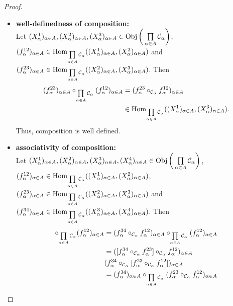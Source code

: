 \documentclass{book}
\begin{document}
	\begin{proof}\
		\begin{itemize}
			\item \textbf{well-definedness of composition: } \\ 
			Let $(X^1_{\alpha})_{\alpha \in A}, (X^2_{\alpha})_{\alpha \in A}, (X^3_{\alpha})_{\alpha \in A} \in \operatorname{Obj} \bigg( \prod\limits_{\alpha \in A} \mathcal{C}_{\alpha} \bigg)$, $(f^{12}_{\alpha})_{\alpha \in A} \in \operatorname{Hom}_{\prod\limits_{\alpha \in A} \mathcal{C}_{\alpha}}((X^1_{\alpha})_{\alpha \in A}, (X^2_{\alpha})_{\alpha \in A})$ and $(f^{23}_{\alpha})_{\alpha \in A} \in \operatorname{Hom}_{\prod\limits_{\alpha \in A} \mathcal{C}_{\alpha}}((X^2_{\alpha})_{\alpha \in A}, (X^3_{\alpha})_{\alpha \in A})$. Then 
			\begin{align*}
				(f^{23}_{\alpha})_{\alpha \in A} \circ_{\prod\limits_{\alpha \in A} \mathcal{C}_{\alpha}} (f^{12}_{\alpha})_{\alpha \in A}
				& = (f^{23}_{\alpha} \circ_{\mathcal{C}_{\alpha}} f^{12}_{\alpha})_{\alpha \in A} \\
				& \in \operatorname{Hom}_{\prod\limits_{\alpha \in A} \mathcal{C}_{\alpha}}((X^1_{\alpha})_{\alpha \in A}, (X^3_{\alpha})_{\alpha \in A}).
			\end{align*}  
			Thus, composition is well defined. \\
			\item \textbf{associativity of composition:} \\
			Let $(X^1_{\alpha})_{\alpha \in A}, (X^2_{\alpha})_{\alpha \in A}, (X^3_{\alpha})_{\alpha \in A}, (X^4_{\alpha})_{\alpha \in A} \in \operatorname{Obj} \bigg(\prod\limits_{\alpha \in A} \mathcal{C}_{\alpha} \bigg)$, $(f^{12}_{\alpha})_{\alpha \in A} \in \operatorname{Hom}_{\prod\limits_{\alpha \in A} \mathcal{C}_{\alpha}}((X^1_{\alpha})_{\alpha \in A}, (X^2_{\alpha})_{\alpha \in A})$, $(f^{23}_{\alpha})_{\alpha \in A} \in \operatorname{Hom}_{\prod\limits_{\alpha \in A} \mathcal{C}_{\alpha}}((X^2_{\alpha})_{\alpha \in A}, (X^3_{\alpha})_{\alpha \in A})$ and $(f^{34}_{\alpha})_{\alpha \in A} \in \operatorname{Hom}_{\prod\limits_{\alpha \in A} \mathcal{C}_{\alpha}}((X^3_{\alpha})_{\alpha \in A}, (X^4_{\alpha})_{\alpha \in A})$. Then 
			\begin{align*}
				[(f^{34}_{\al})_{\al \in A} \circ_{\prod\limits_{\al \in A} \MC_{\al}} (f^{23}_{\al})_{\al \in A}] \circ_{\prod\limits_{\al \in A} \MC_{\al}} (f^{12}_{\al})_{\al \in A}
				& = (f^{34}_{\al} \circ_{\MC_{\al}} f^{12}_{\al})_{\al \in A} \circ_{\prod\limits_{\al \in A} \MC_{\al}} (f^{12}_{\al})_{\al \in A} \\
				& = ([f^{34}_{\al} \circ_{\MC_{\al}} f^{23}_{\al}] \circ_{\MC_{\al}} f^{12}_{\al})_{\al \in A} \\
				& (f^{34}_{\al} \circ_{\MC_{\al}} [f^{23}_{\al} \circ_{\MC_{\al}} f^{12}_{\al}])_{\al \in A} \\
				& = (f^{34}_{\al})_{\al \in A} \circ_{\prod\limits_{\al \in A} \MC_{\al}} (f^{23}_{\al} \circ_{\MC_{\al}} f^{12}_{\al})_{\al \in A} \\

\end{align*}
\end{itemize}
\end{proof}
\end{document}
